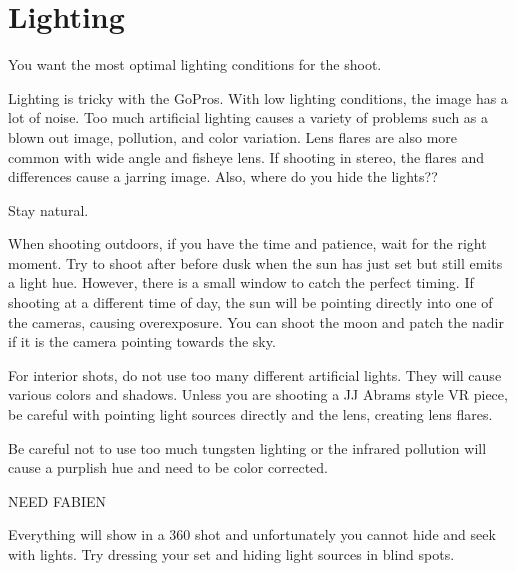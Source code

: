 \chapter{Lighting}
\pagecolor{white}
\label{chap:25}
\begin{fullwidth}


\problem

{\large You want the most optimal lighting conditions for the shoot. \par}

Lighting is tricky with the GoPros. With low lighting conditions, the image has a lot of noise. Too much artificial lighting causes a variety of problems such as a blown out image, pollution, and color variation. Lens flares are also more common with wide angle and fisheye lens. If shooting in stereo, the flares and differences cause a jarring image. Also, where do you hide the lights??

\solution

{\large Stay natural. 
 \par}

When shooting outdoors, if you have the time and patience, wait for the right moment. Try to shoot after before dusk when the sun has just set but still emits a light hue. However, there is a small window to catch the perfect timing. If shooting at a different time of day, the sun will be pointing directly into one of the cameras, causing overexposure. You can shoot the moon and patch the nadir if it is the camera pointing towards the sky. 

For interior shots, do not use too many different artificial lights. They will cause various colors and shadows. Unless you are shooting a JJ Abrams style VR piece, be careful with pointing light sources directly and the lens, creating lens flares.

Be careful not to use too much tungsten lighting or the infrared pollution will cause a purplish hue and need to be color corrected. 

NEED FABIEN

Everything will show in a 360 shot and unfortunately you cannot hide and seek with lights. Try dressing your set and hiding light sources in blind spots. 



\clearpage
\end{fullwidth}